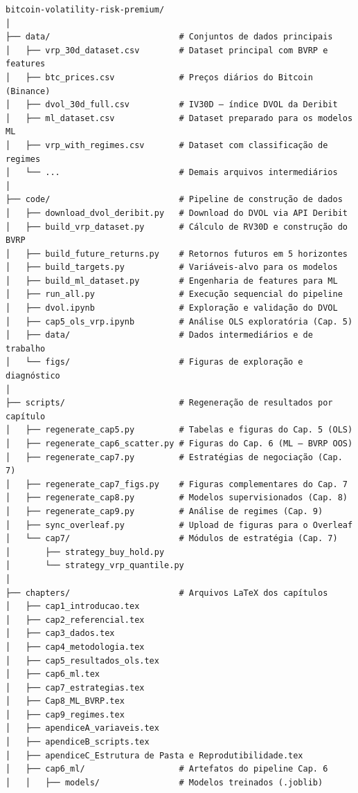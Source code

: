 \begin{verbatim}
bitcoin-volatility-risk-premium/
│
├── data/                          # Conjuntos de dados principais
│   ├── vrp_30d_dataset.csv        # Dataset principal com BVRP e features
│   ├── btc_prices.csv             # Preços diários do Bitcoin (Binance)
│   ├── dvol_30d_full.csv          # IV30D — índice DVOL da Deribit
│   ├── ml_dataset.csv             # Dataset preparado para os modelos ML
│   ├── vrp_with_regimes.csv       # Dataset com classificação de regimes
│   └── ...                        # Demais arquivos intermediários
│
├── code/                          # Pipeline de construção de dados
│   ├── download_dvol_deribit.py   # Download do DVOL via API Deribit
│   ├── build_vrp_dataset.py       # Cálculo de RV30D e construção do BVRP
│   ├── build_future_returns.py    # Retornos futuros em 5 horizontes
│   ├── build_targets.py           # Variáveis-alvo para os modelos
│   ├── build_ml_dataset.py        # Engenharia de features para ML
│   ├── run_all.py                 # Execução sequencial do pipeline
│   ├── dvol.ipynb                 # Exploração e validação do DVOL
│   ├── cap5_ols_vrp.ipynb         # Análise OLS exploratória (Cap. 5)
│   ├── data/                      # Dados intermediários e de trabalho
│   └── figs/                      # Figuras de exploração e diagnóstico
│
├── scripts/                       # Regeneração de resultados por capítulo
│   ├── regenerate_cap5.py         # Tabelas e figuras do Cap. 5 (OLS)
│   ├── regenerate_cap6_scatter.py # Figuras do Cap. 6 (ML — BVRP OOS)
│   ├── regenerate_cap7.py         # Estratégias de negociação (Cap. 7)
│   ├── regenerate_cap7_figs.py    # Figuras complementares do Cap. 7
│   ├── regenerate_cap8.py         # Modelos supervisionados (Cap. 8)
│   ├── regenerate_cap9.py         # Análise de regimes (Cap. 9)
│   ├── sync_overleaf.py           # Upload de figuras para o Overleaf
│   └── cap7/                      # Módulos de estratégia (Cap. 7)
│       ├── strategy_buy_hold.py
│       └── strategy_vrp_quantile.py
│
├── chapters/                      # Arquivos LaTeX dos capítulos
│   ├── cap1_introducao.tex
│   ├── cap2_referencial.tex
│   ├── cap3_dados.tex
│   ├── cap4_metodologia.tex
│   ├── cap5_resultados_ols.tex
│   ├── cap6_ml.tex
│   ├── cap7_estrategias.tex
│   ├── Cap8_ML_BVRP.tex
│   ├── cap9_regimes.tex
│   ├── apendiceA_variaveis.tex
│   ├── apendiceB_scripts.tex
│   ├── apendiceC_Estrutura de Pasta e Reprodutibilidade.tex
│   ├── cap6_ml/                   # Artefatos do pipeline Cap. 6
│   │   ├── models/                # Modelos treinados (.joblib)

\end{verbatim}
